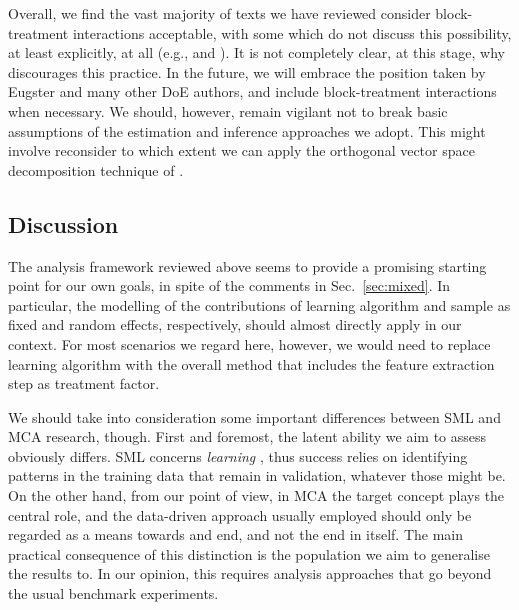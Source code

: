 Overall, we find the vast majority of texts we have reviewed consider
block-treatment interactions acceptable,
with some which do not discuss this possibility,
at least explicitly, at all 
(e.g., \citet{MasonSDAE} and \citet{ChengTFD}).
%
It is not completely clear, at this stage, why \citet{BaileyDCE}
discourages this practice.
%
In the future, we will embrace the position taken by Eugster and
many other DoE authors, and include block-treatment interactions when
necessary.
%
We should, however, remain vigilant not to break basic assumptions
of the estimation and inference approaches we adopt.
%
This might involve reconsider to which extent we can apply
the orthogonal vector space decomposition technique of 
\citet{BaileyDCE}.




\subsection{Discussion}\label{sec:background-dis}

The analysis framework reviewed above seems to provide
a promising starting point for our own goals,
in spite of the comments in Sec.~\ref{sec:mixed}.
%
In particular, the modelling of the contributions of learning algorithm 
and sample as fixed and random effects, respectively, should almost
directly apply in our context.
%
For most scenarios we regard here, however,
we would need to replace learning algorithm with the overall method that
includes the feature extraction step as treatment factor.

We should take into consideration some important differences between
SML and MCA research, though.
%
First and foremost, the latent ability we aim to assess obviously differs.
%
SML concerns \emph{learning} \citep{HernandezOrallo2016Eval},
thus success relies on identifying patterns in the training data that
remain in validation, whatever those might be.
%
On the other hand, from our point of view, in MCA the target concept
plays the central role, and the data-driven approach usually employed
should only be regarded as a means towards and end, and not the end
in itself.
%
The main practical consequence of this distinction is the population
we aim to generalise the results to.
%
%
In our opinion, this requires analysis approaches that go beyond
the usual benchmark experiments.
%

